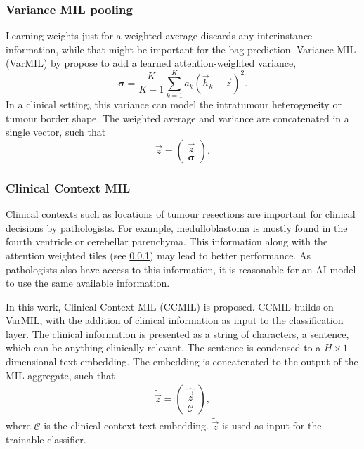 \subsubsection{Variance MIL pooling}\label{subsubsection:theory_varmil}
Learning weights just for a weighted average discards any interinstance information, while that might be important for the bag prediction.
Variance MIL (VarMIL) by \textcite{Schirris2022} propose to add a learned attention-weighted variance,
\begin{equation}
    \boldsymbol{\sigma} = \frac{K}{K - 1} \sum_{k=1}^{K}a_k\left(\vec{h}_k-\vec{z}\right)^2.
\end{equation}
In a clinical setting, this variance can model \eg the intratumour heterogeneity or tumour border shape.
The weighted average and variance are concatenated in a single vector, such that
\begin{equation}
    \hat{\vec{z}} =
    \begin{pmatrix}
        \vec{z} \\
        \boldsymbol{\sigma}    
    \end{pmatrix}.
\end{equation}

\subsubsection{Clinical Context MIL}
Clinical contexts such as locations of tumour resections are important for clinical decisions by pathologists.
For example, medulloblastoma is mostly found in the fourth ventricle or cerebellar parenchyma.
This information along with the attention weighted tiles (see \cref{subsubsection:theory_varmil}) may lead to better performance.
As pathologists also have access to this information, it is reasonable for an AI model to use the same available information.

In this work, Clinical Context MIL (CCMIL) is proposed.
CCMIL builds on VarMIL, with the addition of clinical information as input to the classification layer.
The clinical information is presented as a string of characters, a sentence, which can be anything clinically relevant.
The sentence is condensed to a $H\times1$-dimensional text embedding.
The embedding is concatenated to the output of the MIL aggregate, such that
\begin{align}
    \tilde{\vec{z}} =
    \begin{pmatrix}
        \hat{\vec{z}} \\
        \boldsymbol{\mathcal{C}}
    \end{pmatrix},
\end{align}
where $\boldsymbol{\mathcal{C}}$ is the clinical context text embedding.
$\tilde{\vec{z}}$ is used as input for the trainable classifier.

